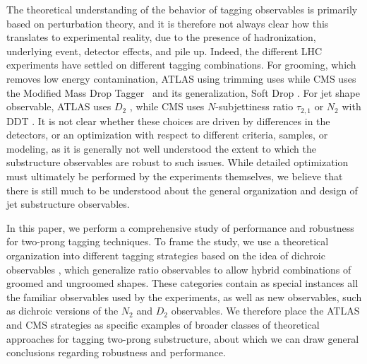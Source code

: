 \documentclass[11pt,letterpaper]{article}
\begin{document}
The
theoretical understanding of the behavior of tagging observables is primarily based on perturbation theory, and it is therefore
not always clear how this translates to experimental reality, due to
the presence of hadronization, underlying event, detector effects, and
pile up.
%
Indeed, the different LHC experiments have settled on different
tagging combinations.
%
For grooming, which removes low energy
contamination,  ATLAS using trimming \cite{Krohn:2009th} uses while CMS uses the Modified
  Mass Drop Tagger~\cite{Dasgupta:2013ihk} and its generalization, Soft Drop \cite{Larkoski:2014wba}.
  For jet shape observable, ATLAS uses $D_2$ \cite{Larkoski:2014gra,Larkoski:2015kga}, while CMS uses $N$-subjettiness ratio $\tau_{2,1}$ \cite{Thaler:2010tr,Thaler:2011gf} or $N_2$ \cite{Moult:2016cvt} with DDT \cite{Dolen:2016kst}.
  It is not clear whether these choices are driven by differences in the detectors, or an optimization with respect to different criteria, samples, or modeling, as it is generally not well understood the extent to which the substructure observables are robust to such issues. While detailed optimization must ultimately be performed by the experiments themselves, we believe that there is still much to be understood about the general organization and design of jet substructure observables.

In this paper, we perform a comprehensive study of performance and robustness for two-prong tagging techniques.
%
To frame the study, we use a theoretical organization into different tagging strategies based on the idea of dichroic observables \cite{Salam:2016yht}, which generalize ratio observables to allow hybrid combinations of groomed and ungroomed shapes.
 These categories contain as special instances all the familiar observables used by the experiments, as well as new observables, such as dichroic versions of the $N_2$ and $D_2$ observables.
 We therefore place the ATLAS and CMS strategies as specific examples of broader classes of theoretical approaches for tagging two-prong substructure, about which we can draw general conclusions regarding robustness and performance.
\end{document}
